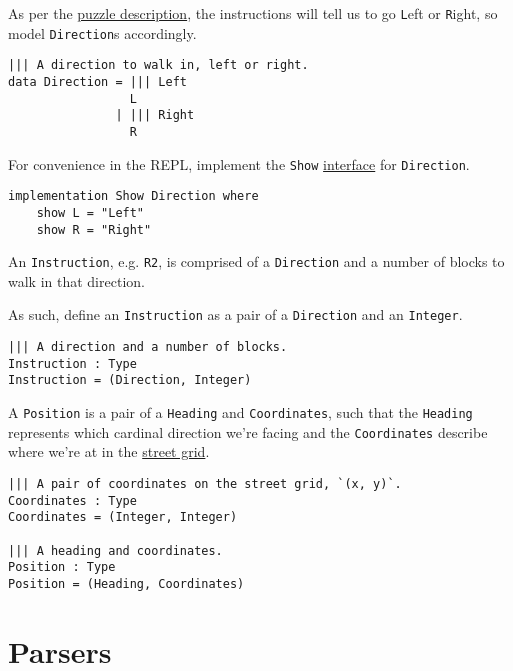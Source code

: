 As per the \href{no-time-for-a-taxicab}{puzzle description}, the
instructions will tell us to go \texttt{L}eft or
\texttt{R}ight, so model \texttt{Direction}s
accordingly.

\begin{verbatim}
||| A direction to walk in, left or right.
data Direction = ||| Left
                 L
               | ||| Right
                 R
\end{verbatim}

For convenience in the REPL, implement the \texttt{Show}
\href{http://docs.idris-lang.org/en/latest/tutorial/interfaces.html}{interface}
for \texttt{Direction}.

\begin{verbatim}
implementation Show Direction where
    show L = "Left"
    show R = "Right"
\end{verbatim}

\newpage

An \texttt{Instruction}, e.g. \texttt{R2}, is
comprised of a \texttt{Direction} and a number of blocks to
walk in that direction.

As such, define an \texttt{Instruction} as a pair of a
\texttt{Direction} and an \texttt{Integer}.

\begin{verbatim}
||| A direction and a number of blocks.
Instruction : Type
Instruction = (Direction, Integer)
\end{verbatim}

A \texttt{Position} is a pair of a
\texttt{Heading} and \texttt{Coordinates},
such that the \texttt{Heading} represents which cardinal
direction we're facing and the \texttt{Coordinates}
describe where we're at in the
\href{https://en.wikipedia.org/wiki/Taxicab_geometry}{street grid}.

\begin{verbatim}
||| A pair of coordinates on the street grid, `(x, y)`.
Coordinates : Type
Coordinates = (Integer, Integer)

||| A heading and coordinates.
Position : Type
Position = (Heading, Coordinates)
\end{verbatim}

\section{Parsers}\label{parsers}

